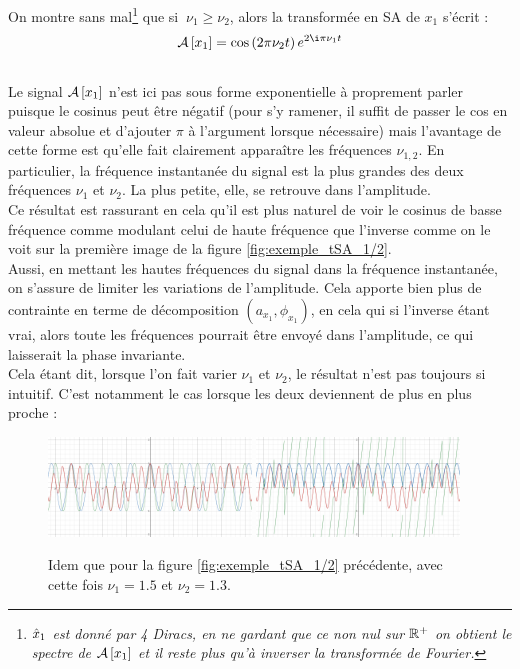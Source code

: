 \noindent
On montre sans mal\footnote{\itshape
	$\hat{x}_1$ est donné par 4 Diracs, en ne gardant que ce non nul sur $\mathbb{R}^+$ on obtient le spectre de $\mathcal{A}\left[x_1\right]$ et il reste plus qu'à inverser la transformée de Fourier.}
que si $\ \nu_1\geq\nu_2$, alors la transformée en SA de $x_1$ s'écrit :
\[\SA{x_1} = \cos \left(2\pi\nu_2 t\right) e^{2\i\pi\nu_1 t}\]
\\
Le signal $\mathcal{A}\left[x_1\right]$ n'est ici pas sous forme exponentielle à proprement parler puisque le cosinus peut être négatif (pour s'y ramener, il suffit de passer le cos en valeur absolue et d'ajouter $\pi$ à l'argument lorsque nécessaire) mais l’avantage de cette forme est qu'elle fait clairement apparaître les fréquences $\nu_{1,2}$. En particulier, la fréquence instantanée du signal est la plus grandes des deux fréquences $\nu_1$ et $\nu_2$. La plus petite, elle, se retrouve dans l'amplitude. 
\\
Ce résultat est rassurant en cela qu'il est plus naturel de voir le cosinus de basse fréquence comme modulant celui de haute fréquence que l'inverse comme on le voit sur la première image de la figure \ref{fig:exemple_tSA_1/2}. 
\\
Aussi, en mettant les hautes fréquences du signal dans la fréquence instantanée, on s'assure de limiter les variations de l'amplitude. Cela apporte bien plus de contrainte en terme de décomposition $(a_{x_1},\phi_{x_1})$, en cela qui si l'inverse étant vrai, alors toute les fréquences pourrait être envoyé dans l'amplitude, ce qui laisserait la phase invariante.
\\

Cela étant dit, lorsque l'on fait varier $\nu_1$ et $\nu_2$, le résultat n'est pas toujours si intuitif. C'est notamment le cas lorsque les deux deviennent de plus en plus proche :

\begin{figure}[h]\centering
	\includegraphics[width=0.48\textwidth]{fig/ex SA - 21.png}\hfill
	\includegraphics[width=0.48\textwidth]{fig/ex SA - 22.png}
	\caption{Idem que pour la figure \ref{fig:exemple_tSA_1/2} précédente, avec cette fois $\nu_1=1.5$ et $\nu_2=1.3$.}
	\label{fig:exemple_tSA_2/2}
\end{figure}

